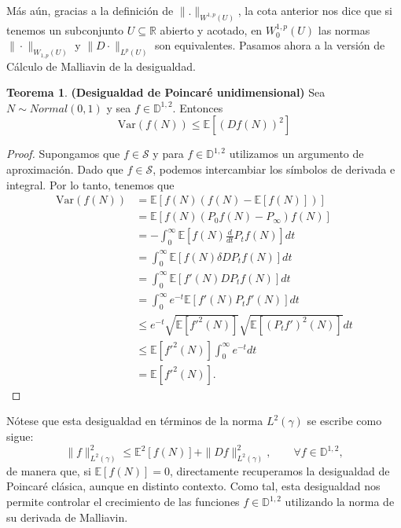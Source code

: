 \documentclass[letterpaper,twoside,12pt]{book}
\newcommand{\R}{\mathbb{R}}
\newcommand{\D}{\mathbb{D}}
\renewcommand{\S}{\mathcal{S}}
\newcommand{\E}{\mathbb{E}}
\newcommand{\1}{\mathds{1}}
\theoremstyle{definition}
\theoremstyle{definition}
\newtheorem{teo}{Teorema}
\theoremstyle{remark}
\theoremstyle{definition}
\theoremstyle{definition}
\theoremstyle{definition}
\theoremstyle{definition}
\theoremstyle{definition}
\begin{document}
   Más aún, gracias a la definición de $\|.\|_{W^{1,p}(U)}$, la cota anterior nos dice que si tenemos un subconjunto $U\subseteq \R$ abierto y acotado, en $W_0^{1,p}(U)$ las normas $\|\cdot\|_{W_{1,p}(U)}$ y $\|D\cdot\|_{L^p(U)}$ son equivalentes. Pasamos ahora a la versión de Cálculo de Malliavin de la desigualdad.
   \begin{teo} \textbf{(Desigualdad de Poincaré unidimensional)} Sea $N\sim Normal(0,1)$ y sea $f\in \D^{1,2}$. Entonces
       \[
       \text{Var}\left(f(N)\right)\leq\E\left[(Df(N))^2\right]    
       \]     
    \end{teo}
    \begin{proof} 
        Supongamos que $f\in \S$ y para $f\in \D^{1,2}$ utilizamos un argumento de aproximación. Dado que $f\in \S$, podemos intercambiar los símbolos de derivada e integral. Por lo tanto, tenemos que 
        \begin{align*}
            \text{Var}\left(f(N)\right)&=\E\left[f(N)(f(N)-\E\left[f(N)\right])\right]\\
            &=\E\left[f(N)(P_0f(N)-P_\infty)f(N)\right]\\
            &=-\int_{0}^{\infty}\E\left[f(N)\frac{d}{dt}P_tf(N)\right]dt\\
            &=\int_{0}^{\infty}\E\left[f(N)\delta DP_tf(N)\right]dt\\
            &=\int_{0}^{\infty}\E\left[f'(N)DP_tf(N)\right]dt\\
            &=\int_{0}^{\infty}e^{-t}\E\left[f'(N)P_tf'(N)\right]dt\\
            &\leq e^{-t}\sqrt{\E\left[f'^2(N)\right]}\sqrt{\E\left[(P_tf')^2(N)\right]}dt\\
            &\leq \E\left[f'^2(N)\right]\int_{0}^{\infty}e^{-t}dt\\
            &=\E\left[f'^2(N)\right].
        \end{align*} 
     \end{proof}
Nótese que esta desigualdad en términos de la norma $L^2(\gamma)$ se escribe como sigue:
\[
\|f\|^2_{L^2(\gamma)}\leq \E^2\left[f(N)\right]+\|Df\|^2_{L^2(\gamma)}, \qquad \forall f\in \D^{1,2},
\]
de manera que, si $\E\left[f(N)\right]=0$, directamente recuperamos la desigualdad de Poincaré clásica, aunque en distinto contexto. Como tal, esta desigualdad nos permite controlar el crecimiento de las funciones $f\in \D^{1,2}$ utilizando la norma de su derivada de Malliavin.
\end{document}
